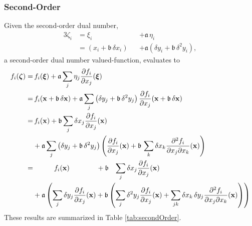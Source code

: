 \subsubsection{Second-Order}

Given the second-order dual number,
%
\begin{alignat*}{3}
\zeta_{i} 
&=
\xi_{i} 
&&+ \mathfrak{a} \, \eta_{i}
\\
&=
\left( x_{i} + \mathfrak{b} \, \delta x_{i} \right)
&&+ \mathfrak{a} \left( \delta y_{i} + \mathfrak{b} \, \delta^{2} y_{i} \right),
\end{alignat*}
%
a second-order dual number valued-function, evaluates to
%
\begin{align*}
f_{i} \! \left(  \mbox{\boldmath{$\zeta$}} \right)
=& \,
f_{i} \! \left(  \mbox{\boldmath{$\xi$}} \right) 
+ \mathfrak{a} \sum_{j} \eta_{j} \frac{ \partial f_{i} }{ \partial x_{j} } \! \left(  \mbox{\boldmath{$\xi$}} \right) 
\\
=& \,
f_{i} \! \left( \mathbf{x} + \mathfrak{b} \, \delta \mathbf{x} \right) 
+ \mathfrak{a} \sum_{j} \left( \delta y_{j} + \mathfrak{b} \, \delta^{2} y_{j} \right)
\frac{ \partial f_{i} }{ \partial x_{j} } 
\! \left( \mathbf{x} + \mathfrak{b} \, \delta \mathbf{x} \right) 
\\
=& \,
f_{i} \! \left( \mathbf{x} \right) 
+ \mathfrak{b} \sum_{j} \delta x_{j}  \frac{ \partial f_{i} }{ \partial x_{j} } \! \left( \mathbf{x} \right)
\\
&+ 
\mathfrak{a} \sum_{j} \left( \delta y_{j} + \mathfrak{b} \, \delta^{2} y_{j} \right)
\left( \frac{ \partial f_{i} }{ \partial x_{j} } \! \left( \mathbf{x}\right) + 
\mathfrak{b} \, \sum_{k} \delta x_{k} 
\frac{ \partial^{2} f_{i} }{ \partial x_{j} \partial x_{k} } \! \left( \mathbf{x} \right) \right) 
\\
=&
\quad\quad\quad 
f_{i} \! \left( \mathbf{x} \right) 
\quad\quad\quad\;\;\;
+ \mathfrak{b} \;\;\;
\sum_{j} \delta x_{j}  \frac{ \partial f_{i} }{ \partial x_{j} } \! \left( \mathbf{x} \right)
\\
&+ 
\mathfrak{a} \left( 
\sum_{j} \delta y_{j} \frac{ \partial f_{i} }{ \partial x_{j} } \! \left( \mathbf{x} \right) 
+ \mathfrak{b} \left(
\sum_{j} \delta^{2} y_{j} \frac{ \partial f_{i} }{ \partial x_{j} } \! \left( \mathbf{x} \right)
+ \sum_{jk} \delta x_{k} \, \delta y_{j}
\frac{ \partial^{2} f_{i} }{ \partial x_{j} \partial x_{k} } \! \left( \mathbf{x} \right)
\right)
\right)
\end{align*}
%
These results are summarized in Table \ref{tab:secondOrder}.

